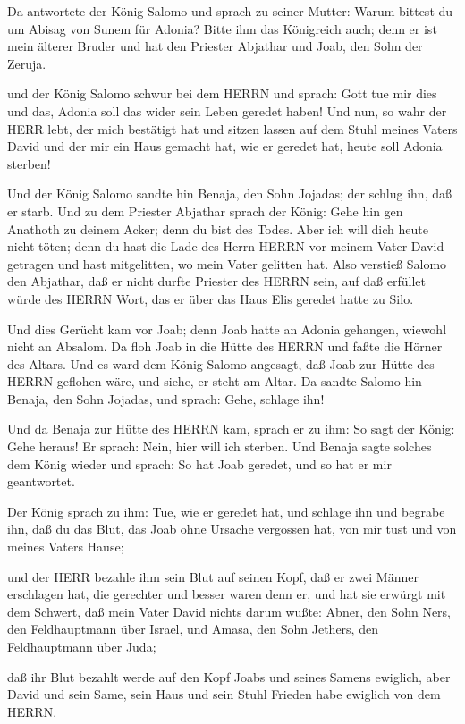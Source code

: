  Da antwortete der König Salomo und sprach zu seiner
Mutter: Warum bittest du um Abisag von Sunem für Adonia? Bitte ihm das
Königreich auch; denn er ist mein älterer Bruder und hat den Priester
Abjathar und Joab, den Sohn der Zeruja.

 und der König Salomo schwur bei dem HERRN und sprach: Gott
tue mir dies und das, Adonia soll das wider sein Leben geredet haben!
 Und nun, so wahr der HERR lebt, der mich bestätigt hat und
sitzen lassen auf dem Stuhl meines Vaters David und der mir ein Haus
gemacht hat, wie er geredet hat, heute soll Adonia sterben!

 Und der König Salomo sandte hin Benaja, den Sohn Jojadas;
der schlug ihn, daß er starb.  Und zu dem Priester Abjathar
sprach der König: Gehe hin gen Anathoth zu deinem Acker; denn du bist
des Todes. Aber ich will dich heute nicht töten; denn du hast die Lade
des Herrn HERRN vor meinem Vater David getragen und hast mitgelitten, wo
mein Vater gelitten hat.  Also verstieß Salomo den
Abjathar, daß er nicht durfte Priester des HERRN sein, auf daß erfüllet
würde des HERRN Wort, das er über das Haus Elis geredet hatte zu Silo.

 Und dies Gerücht kam vor Joab; denn Joab hatte an Adonia
gehangen, wiewohl nicht an Absalom. Da floh Joab in die Hütte des HERRN
und faßte die Hörner des Altars.  Und es ward dem König
Salomo angesagt, daß Joab zur Hütte des HERRN geflohen wäre, und siehe,
er steht am Altar. Da sandte Salomo hin Benaja, den Sohn Jojadas, und
sprach: Gehe, schlage ihn!

 Und da Benaja zur Hütte des HERRN kam, sprach er zu ihm:
So sagt der König: Gehe heraus! Er sprach: Nein, hier will ich sterben.
Und Benaja sagte solches dem König wieder und sprach: So hat Joab
geredet, und so hat er mir geantwortet.

 Der König sprach zu ihm: Tue, wie er geredet hat, und
schlage ihn und begrabe ihn, daß du das Blut, das Joab ohne Ursache
vergossen hat, von mir tust und von meines Vaters Hause;

 und der HERR bezahle ihm sein Blut auf seinen Kopf, daß er
zwei Männer erschlagen hat, die gerechter und besser waren denn er, und
hat sie erwürgt mit dem Schwert, daß mein Vater David nichts darum
wußte: Abner, den Sohn Ners, den Feldhauptmann über Israel, und Amasa,
den Sohn Jethers, den Feldhauptmann über Juda;

 daß ihr Blut bezahlt werde auf den Kopf Joabs und seines
Samens ewiglich, aber David und sein Same, sein Haus und sein Stuhl
Frieden habe ewiglich von dem HERRN.


